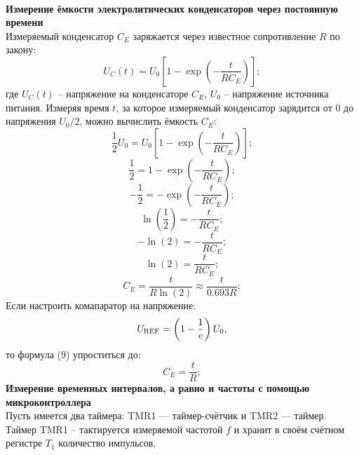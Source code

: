 \documentclass[12pt,a4paper]{article}
\newcommand{\ds}{\displaystyle}
\begin{document}
	\\
	\textbf{Измерение ёмкости электролитических конденсаторов 
	через постоянную времени} \\
	Измеряемый конденсатор $C_E$ заряжается через известное 
	сопротивление $R$ по закону: \\
	\begin{equation} 
		\ds U_C(t) = U_0\left[1-\exp\left(-\frac{t}{RC_E}\right)\right];
	\end{equation}
	где $U_C(t)$ -- напряжение на конденсаторе $C_E$, 
	$U_0$ -- напряжение источника питания.
	Измеряя время $t$, за которое измеряемый конденсатор 
	зарядится от $0$ до напряжения $U_0/2$,
	можно вычислить ёмкость $C_E$: \\
	\begin{equation*} 
		\ds \frac12U_0 = U_0\left[1-\exp\left(-\frac{t}{RC_E}\right)\right];
	\end{equation*}
	\begin{equation*} 
		\ds \frac12 = 1-\exp\left(-\frac{t}{RC_E}\right);
	\end{equation*}
	\begin{equation*} 
		\ds -\frac12 = -\exp\left(-\frac{t}{RC_E}\right);
	\end{equation*}
	\begin{equation*} 
		\ds \ln\left(\frac12\right) = -\frac{t}{RC_E};
	\end{equation*}
	\begin{equation*} 
		\ds -\ln(2) = -\frac{t}{RC_E};
	\end{equation*}
	\begin{equation*} 
		\ds \ln(2) = \frac{t}{RC_E};
	\end{equation*}
	\begin{equation} 
		\ds C_E = \frac{t}{R\ln(2)} \approx \frac{t}{0.693R};
	\end{equation}
	Если настроить комапаратор на напряжение:
	\begin{equation*} 
		\ds U_{\rm REF} = \left(1-\frac1e\right)U_0,
	\end{equation*}
	то формула (9) упроститься до:
	\begin{equation} 
		\ds C_E = \frac{t}{R};
	\end{equation}
	\newpage
	\textbf{Измерение временных интервалов, а равно и частоты 
	с помощью микроконтроллера} \\
	Пусть имеется два таймера: TMR1 --- таймер-счётчик и 
	TMR2 --- таймер.
	Таймер TMR1 -- тактируется измеряемой частотой $f$ и 
	хранит в своём счётном регистре $T_1$ количество импульсов, 
\end{document}
